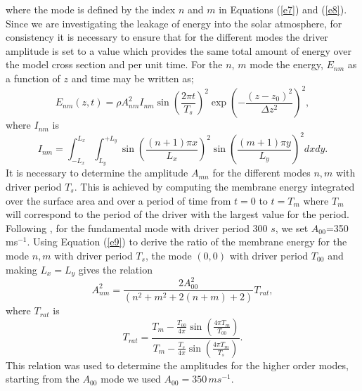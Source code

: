 \documentclass[preprint,authoryear,12pt]{elsarticle}
\begin{document}
where the mode is defined by the index $n$ and $m$ in Equations (\ref{e7}) and (\ref{e8}). Since we are investigating the leakage of energy into the solar atmosphere, for consistency it is necessary to ensure that for the different modes the driver amplitude is set to a value which provides the same total amount of energy over the model cross section and per unit time. For the $n$, $m$ mode the energy, $E_{nm}$ as a function of $z$ and time may be written as;
\begin{equation}
E_{nm}(z,t)= \rho A_{nm}^{2} I_{nm}  \sin{\left(\frac{2\pi t}{T_s} \right)}^2
\exp{\left( -\frac{(z-z_0)^2}{\Delta z^{2}} \right)}^2,
\label{e9}
\end{equation}
where $I_{nm}$ is
$$
I_{nm}= \int_{-L_{x}}^{L_{x}} \int_{L_{y}}^{+L_{y}} \sin{\left(\frac{(n+1)\pi x}{L_x} \right)}^{2}   \sin{\left(  \frac{(m+1)\pi y}{L_y} \right)}^{2}dxdy. 
$$
It is necessary to determine the amplitude $A_{mn}$ for the different modes $n, m$ with driver period 
$T_{s}$. This is achieved by computing the membrane energy integrated over the surface area and 
over a period of time from $t=0$ to $t=T_{m}$ where $T_m$ will correspond to the period of the driver 
with the largest value for the period. Following  \citet{Leighton1960}, for the fundamental mode with 
driver period 300 $s$, we set $A_{00}$=350\, ms$^{-1}$. 
Using Equation (\ref{e9}) to derive the ratio of the membrane energy for the mode $n, m$ with 
driver period $T_{s}$, the mode $(0, 0)$ with driver period $T_{00}$ and making $L_x=L_y$ 
gives the relation
\begin{equation}
A_{nm}^{2}=\frac{2A_{00}^{2}}{(n^2+m^2+2(n+m)+2)}T_{rat},
\label{e10}
\end{equation}
where $T_{rat}$ is
$$
T_{rat}=
\frac{T_m-\frac{T_{00}}{4\pi}   \sin(\frac{4\pi T_m}{T_{00}})    }{T_m-\frac{T_{s}}{4\pi}   \sin(\frac{4\pi T_m}{T_{s}})}. 
$$
This relation was used to determine the amplitudes for the higher order modes, starting from the $A_{00}$ mode we used  $A_{00}=350\, ms^{-1}$.
\end{document}
